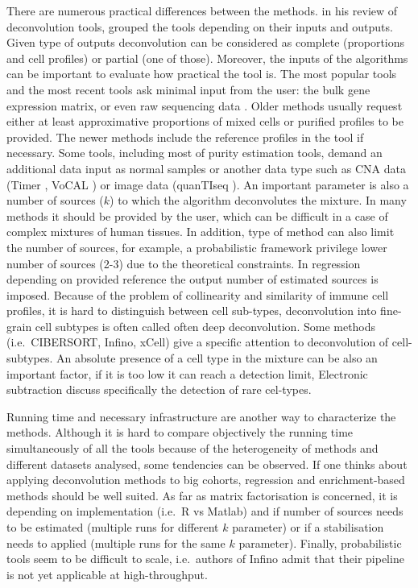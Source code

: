\documentclass[12pt,]{book}
\theoremstyle{definition}
\theoremstyle{definition}
\theoremstyle{definition}
\theoremstyle{remark}
\begin{document}
There are numerous practical differences between the methods.
\citet{Shen-Orr2013} in his review of deconvolution tools, grouped the
tools depending on their inputs and outputs. Given type of outputs
deconvolution can be considered as complete (proportions and cell
profiles) or partial (one of those). Moreover, the inputs of the
algorithms can be important to evaluate how practical the tool is. The
most popular tools and the most recent tools ask minimal input from the
user: the bulk gene expression matrix, or even raw sequencing data
\citep{Finotello2017}. Older methods usually request either at least
approximative proportions of mixed cells or purified profiles to be
provided. The newer methods include the reference profiles in the tool
if necessary. Some tools, including most of purity estimation tools,
demand an additional data input as normal samples or another data type
such as CNA data (Timer \citep{Li2013}, VoCAL \citep{Steuerman2016}) or
image data (quanTIseq \citep{Finotello2017}). An important parameter is
also a number of sources (\(k\)) to which the algorithm deconvolutes the
mixture. In many methods it should be provided by the user, which can be
difficult in a case of complex mixtures of human tissues. In addition,
type of method can also limit the number of sources, for example, a
probabilistic framework privilege lower number of sources (2-3) due to
the theoretical constraints. In regression depending on provided
reference the output number of estimated sources is imposed. Because of
the problem of collinearity and similarity of immune cell profiles, it
is hard to distinguish between cell sub-types, deconvolution into
fine-grain cell subtypes is often called often deep deconvolution. Some
methods (i.e.~CIBERSORT, Infino, xCell) give a specific attention to
deconvolution of cell-subtypes. An absolute presence of a cell type in
the mixture can be also an important factor, if it is too low it can
reach a detection limit, Electronic subtraction \citep{Gosink2007}
discuss specifically the detection of rare cel-types.

Running time and necessary infrastructure are another way to
characterize the methods. Although it is hard to compare objectively the
running time simultaneously of all the tools because of the
heterogeneity of methods and different datasets analysed, some
tendencies can be observed. If one thinks about applying deconvolution
methods to big cohorts, regression and enrichment-based methods should
be well suited. As far as matrix factorisation is concerned, it is
depending on implementation (i.e.~R vs Matlab) and if number of sources
needs to be estimated (multiple runs for different \(k\) parameter) or
if a stabilisation needs to applied (multiple runs for the same \(k\)
parameter). Finally, probabilistic tools seem to be difficult to scale,
i.e.~authors of Infino admit that their pipeline is not yet applicable
at high-throughput.
\end{document}
